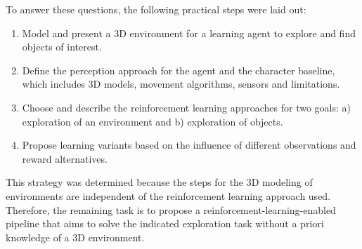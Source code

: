 To answer these questions, the following practical steps were laid out:
\begin{enumerate}
    \item Model and present a 3D environment for a learning agent to explore and find objects of interest.
    \item Define the perception approach for the agent and the character baseline, which includes 3D models, movement algorithms, sensors and limitations.
    \item Choose and describe the reinforcement learning approaches for two goals: a) exploration of an environment and b) exploration of objects.
    \item Propose learning variants based on the influence of different observations and reward alternatives.
\end{enumerate}
This strategy was determined because the steps for the 3D modeling of environments are independent of the reinforcement learning approach used. Therefore, the remaining task is to propose a reinforcement-learning-enabled pipeline that aims to solve the indicated exploration task without a priori knowledge of a 3D environment.
